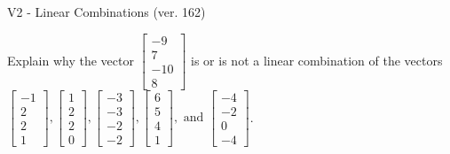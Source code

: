 \begin{exercise}
  \begin{exerciseTitle}V2 - Linear Combinations (ver. 162)\end{exerciseTitle}
  \begin{exerciseStatement}
    Explain why the vector \(\left[\begin{array}{c}
-9 \\
7 \\
-10 \\
8
\end{array}\right]\)  is or is not a linear 
	combination of the vectors \(\left[\begin{array}{c}
-1 \\
2 \\
2 \\
1
\end{array}\right] , \left[\begin{array}{c}
1 \\
2 \\
2 \\
0
\end{array}\right] , \left[\begin{array}{c}
-3 \\
-3 \\
-2 \\
-2
\end{array}\right] , \left[\begin{array}{c}
6 \\
5 \\
4 \\
1
\end{array}\right] , \text{ and } \left[\begin{array}{c}
-4 \\
-2 \\
0 \\
-4
\end{array}\right]\).
	



\end{exerciseStatement}
\end{exercise}
